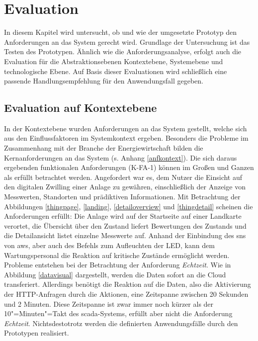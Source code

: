 \section{Evaluation}

In diesem Kapitel wird untersucht, ob und wie der umgesetzte Prototyp den Anforderungen an das System gerecht wird. Grundlage der Untersuchung ist das Testen des Prototypen. Ähnlich wie die Anforderungsanalyse, erfolgt auch die Evaluation für die Abstraktionsebenen Kontextebene, Systemebene und technologische Ebene. Auf Basis dieser Evaluationen wird schließlich eine passende Handlungsempfehlung für den Anwendungsfall gegeben. 

\subsection{Evaluation auf Kontextebene}
In der Kontextebene wurden Anforderungen an das System gestellt, welche sich aus den Einflussfaktoren im Systemkontext ergeben. Besonders die Probleme im Zusammenhang mit der Branche der Energiewirtschaft bilden die Kernanforderungen an das System (s. Anhang \ref{anfkontext}). Die sich daraus ergebenden funktionalen Anforderungen (K-FA-1) können im Großen und Ganzen als erfüllt betrachtet werden. Angefordert war es, dem Nutzer die Einsicht auf den digitalen Zwilling einer Anlage zu gewähren, einschließlich der Anzeige von Messwerten, Standorten und prädiktiven Informationen. Mit Betrachtung der Abbildungen \ref{thingpage}, \ref{landing}, \ref{detailoverview} und \ref{thingdetail} scheinen die Anforderungen erfüllt: Die Anlage wird auf der Startseite auf einer Landkarte verortet, die Übersicht über den Zustand liefert Bewertungen des Zustands und die Detailansicht listet einzelne Messwerte auf. Anhand der Einbindung des \ac{sns} von \ac{aws}, aber auch des Befehls zum Aufleuchten der LED, kann dem Wartungspersonal die Reaktion auf kritische Zustände ermöglicht werden. Probleme entstehen bei der Betrachtung der Anforderung \textit{Echtzeit}. Wie in Abbildung \ref{datavisual} dargestellt, werden die Daten sofort an die Cloud transferiert. Allerdings benötigt die Reaktion auf die Daten, also die Aktivierung der HTTP-Anfragen durch die Aktionen, eine Zeitspanne zwischen 20 Sekunden und 2 Minuten. Diese Zeitspanne ist zwar immer noch kürzer als der 10"=Minuten"=Takt des \ac{scada}-Systems, erfüllt aber nicht die Anforderung \textit{Echtzeit}. Nichtsdestotrotz werden die definierten Anwendungsfälle durch den Prototypen realisiert. 

